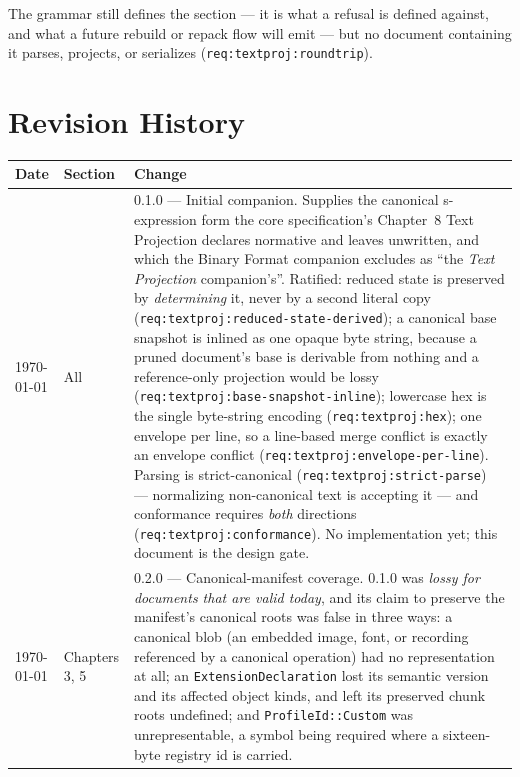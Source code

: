 \documentclass[11pt,letterpaper]{report}
\newcommand{\sectionsc}[1]{{\addfontfeatures{Letters=SmallCaps}#1}}
\begin{document}
The grammar still defines the section --- it is what a refusal is defined
against, and what a future rebuild or repack flow will emit --- but no document
containing it parses, projects, or serializes
(\texttt{req:textproj:roundtrip}).

\chapter{Revision History}
\label{ch:history}

\begin{longtable}{p{2cm} p{2.5cm} p{9cm}}
  \toprule
  \textbf{Date} & \textbf{Section} & \textbf{Change} \\
  \midrule
  \endhead
  \today & All & 0.1.0 --- Initial companion. Supplies the canonical
  s-expression form the core specification's Chapter~8
  \sectionsc{Text Projection} declares normative and leaves unwritten, and which
  the Binary Format companion excludes as ``the \emph{Text Projection}
  companion's''. Ratified: reduced state is preserved by \emph{determining} it,
  never by a second literal copy (\texttt{req:textproj:reduced-state-derived});
  a canonical base snapshot is inlined as one opaque byte string, because a
  pruned document's base is derivable from nothing and a reference-only
  projection would be lossy (\texttt{req:textproj:base-snapshot-inline});
  lowercase hex is the single byte-string encoding
  (\texttt{req:textproj:hex}); one envelope per line, so a line-based merge
  conflict is exactly an envelope conflict
  (\texttt{req:textproj:envelope-per-line}). Parsing is strict-canonical
  (\texttt{req:textproj:strict-parse}) --- normalizing non-canonical text is
  accepting it --- and conformance requires \emph{both} directions
  (\texttt{req:textproj:conformance}). No implementation yet; this document is
  the design gate. \\
    \today & Chapters 3, 5 & 0.2.0 --- Canonical-manifest coverage. 0.1.0 was
  \emph{lossy for documents that are valid today}, and its claim to preserve the
  manifest's canonical roots was false in three ways: a canonical blob (an
  embedded image, font, or recording referenced by a canonical operation) had no
  representation at all; an \texttt{ExtensionDeclaration} lost its semantic
  version and its affected object kinds, and left its preserved chunk roots
  undefined; and \texttt{ProfileId::Custom} was unrepresentable, a symbol being
  required where a sixteen-byte registry id is carried.


\end{longtable}
\end{document}
